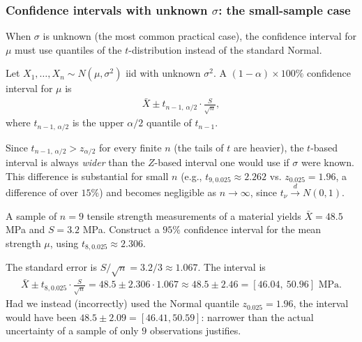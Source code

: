 \subsubsection{Confidence intervals with unknown $\sigma$: the small-sample case}

When $\sigma$ is unknown (the most common practical case), the confidence interval for $\mu$ must use quantiles of the $t$-distribution instead of the standard Normal.

\begin{teorema}
 \label{eq:5.4.1}
Let $X_1, \ldots, X_n \sim N(\mu, \sigma^2)$ iid with unknown $\sigma^2$. A $(1-\alpha)\times 100\%$ confidence interval for $\mu$ is
\begin{align}
 \bar{X} \pm t_{n-1,\,\alpha/2} \cdot \frac{S}{\sqrt{n}},
\end{align}
where $t_{n-1,\,\alpha/2}$ is the upper $\alpha/2$ quantile of $t_{n-1}$.
\end{teorema}

\begin{observacion}
Since $t_{n-1,\,\alpha/2} > z_{\alpha/2}$ for every finite $n$ (the tails of $t$ are heavier), the $t$-based interval is always \emph{wider} than the $Z$-based interval one would use if $\sigma$ were known. This difference is substantial for small $n$ (e.g., $t_{9,0.025}\approx 2.262$ vs. $z_{0.025}=1.96$, a difference of over $15\%$) and becomes negligible as $n \to \infty$, since $t_\nu \xrightarrow{d} N(0,1)$.
\end{observacion}

\begin{ejemplo}
 \label{exmp:5.4.1}
A sample of $n=9$ tensile strength measurements of a material yields $\bar{X}=48.5$ MPa and $S=3.2$ MPa. Construct a $95\%$ confidence interval for the mean strength $\mu$, using $t_{8,0.025}\approx 2.306$.
\end{ejemplo}

\begin{solucion}
The standard error is $S/\sqrt{n} = 3.2/3 \approx 1.067$. The interval is
\begin{align}
 \bar{X} \pm t_{8,0.025}\cdot\frac{S}{\sqrt{n}} = 48.5 \pm 2.306\cdot 1.067
 \approx 48.5 \pm 2.46 = [46.04,\ 50.96] \text{ MPa}.
\end{align}
Had we instead (incorrectly) used the Normal quantile $z_{0.025}=1.96$, the interval would have been $48.5 \pm 2.09 = [46.41, 50.59]$: narrower than the actual uncertainty of a sample of only $9$ observations justifies.
\end{solucion}
